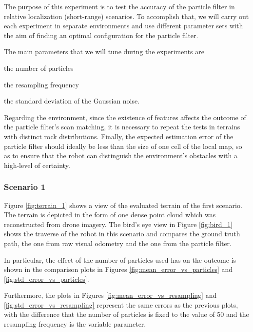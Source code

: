 The purpose of this experiment is to test the accuracy of the particle filter
in relative localization (short-range) scenarios.
To accomplish that, we will carry out each experiment in separate
environments and use different parameter sets with the aim of finding an
optimal configuration for the particle filter.

The main parameters that we will tune during the experiments are
\begin{enumerate*}[label=(\roman*)]
        \item the number of particles
        \item the resampling frequency
        \item the standard deviation of the Gaussian noise.
\end{enumerate*}
Regarding the environment, since the existence of features affects the
outcome of the particle filter's scan matching, it is necessary to
repeat the tests in terrains with distinct rock distributions.
Finally, the expected estimation error of the particle filter should
ideally be less than the size of one cell of the local map, so as to
ensure that the robot can distinguish the environment's obstacles with
a high-level of certainty.

\subsubsection{Scenario 1}

Figure \ref{fig:terrain_1} shows a view of the evaluated terrain of the first
scenario.
The terrain is depicted in the form of one dense point cloud which was
reconstructed from drone imagery.
The bird's eye view in Figure \ref{fig:bird_1} shows the traverse of the
robot in this scenario and compares the ground truth path, the one
from raw visual odometry and the one from the particle filter.

In particular, the effect of the number of particles used has on
the outcome is shown in the comparison plots in Figures
\ref{fig:mean_error_vs_particles} and \ref{fig:std_error_vs_particles}.

Furthermore, the plots in Figures \ref{fig:mean_error_vs_resampling} and
\ref{fig:std_error_vs_resampling} represent the same errors as the previous
plots, with the difference that the number of particles is fixed to the
value of 50 and the resampling frequency is the variable parameter.

